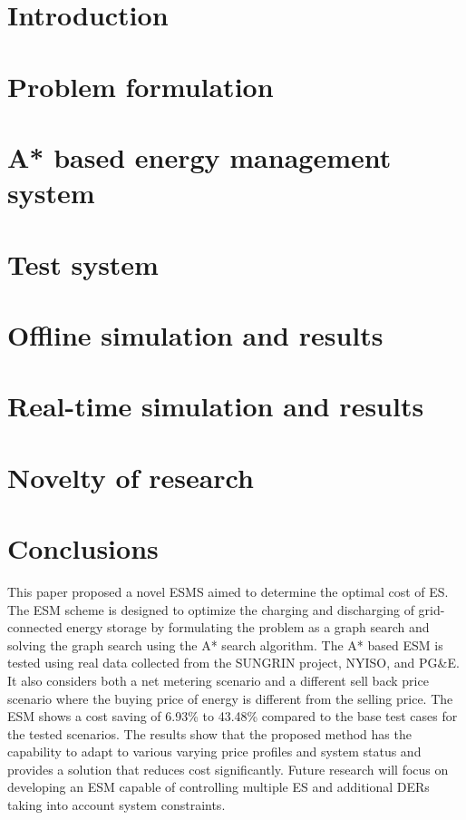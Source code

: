 \documentclass[journal]{IEEEtran}
\begin{document}
\IEEEpeerreviewmaketitle


\section{Introduction}


\section{Problem formulation} \label{formulation}


\section{A* based energy management system} \label{A*}


\section{Test system} \label{sys}


\section{Offline simulation and results} \label{OFF}


\section{Real-time simulation and results} \label{RT}


\section{Novelty of research} \label{Novelty}


\section{Conclusions}
This paper proposed a novel ESMS aimed to determine the optimal cost of ES. The ESM scheme is designed to optimize the charging and discharging of grid-connected energy storage by formulating the problem as a graph search and solving the graph search using the A* search algorithm. The A* based ESM is tested using real data collected from the SUNGRIN project, NYISO, and PG\&E. It also considers both a net metering scenario and a different sell back price scenario where the buying price of energy is different from the selling price. The ESM shows a cost saving of 6.93\% to 43.48\% compared to the base test cases for the tested scenarios. The results show that the proposed method has the capability to adapt to various varying price profiles and system status and provides a solution that reduces cost significantly. Future research will focus on developing an ESM capable of controlling multiple ES and additional DERs taking into account system constraints.




\ifCLASSOPTIONcaptionsoff
  \newpage
\fi
\end{document}
